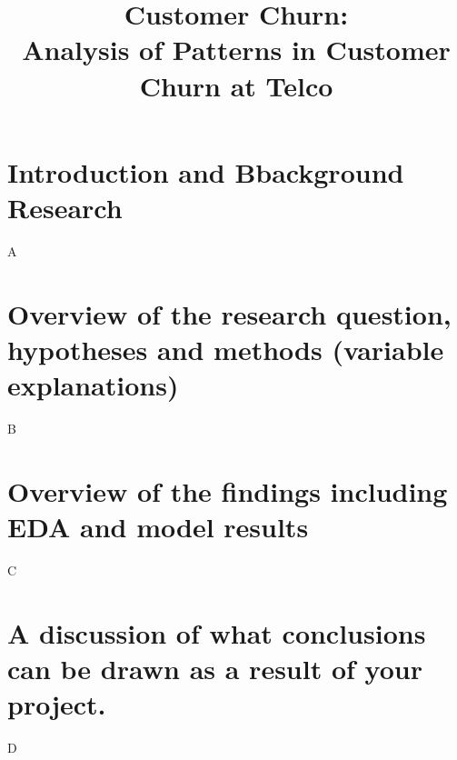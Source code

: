 \documentclass[a4paper,man,english]{apa}
\title{Customer Churn:\\Analysis of Patterns in Customer Churn at Telco}
\begin{document}
  \maketitle

  \section{Introduction and Bbackground Research}
  A
  \section{Overview of the research question, hypotheses and methods (variable
explanations)}
  B
  \section{Overview of the findings including EDA and model results}
  C
  \section{A discussion of what conclusions can be drawn as a result of your project.}
  D
\end{document}
